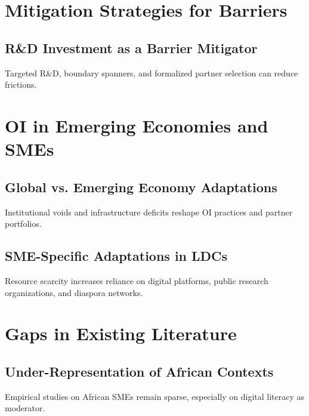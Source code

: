 \section{Mitigation Strategies for Barriers}
\subsection{R\&D Investment as a Barrier Mitigator}
Targeted R\&D, boundary spanners, and formalized partner selection can reduce frictions.

\section{OI in Emerging Economies and SMEs}
\subsection{Global vs. Emerging Economy Adaptations}
Institutional voids and infrastructure deficits reshape OI practices and partner portfolios.

\subsection{SME-Specific Adaptations in LDCs}
Resource scarcity increases reliance on digital platforms, public research organizations, and diaspora networks.

\section{Gaps in Existing Literature}
\subsection{Under-Representation of African Contexts}
Empirical studies on African SMEs remain sparse, especially on digital literacy as moderator.
